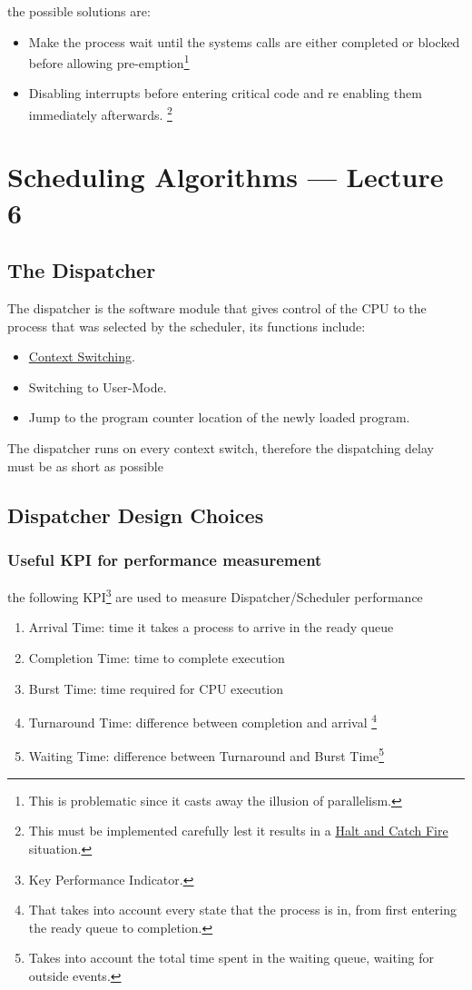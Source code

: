 \documentclass[openright, twoside]{report}
\theoremstyle{definition}
\theoremstyle{example}
\begin{document}
				the possible solutions are:
				\begin{itemize}
					\item Make the process wait until the systems calls are either completed or blocked before  
					allowing pre-emption\footnote{This is problematic since it casts away the illusion of parallelism.}
					\item Disabling interrupts before entering critical code and re enabling 
					them immediately afterwards. \footnote{This must be implemented carefully
					lest it results in a \href{https://en.wikipedia.org/wiki/Halt_and_Catch_Fire_(computing)}{Halt and Catch Fire} situation.}
				\end{itemize}
				
\chapter{Scheduling Algorithms --- Lecture 6}
		\section{The Dispatcher}
			The dispatcher is the software module that gives control of the CPU to the 
			process that was selected by the scheduler, its functions include:
			\begin{itemize}
				\item \hyperref[ssec:context]{Context Switching}. 
				\item Switching to User-Mode.
				\item Jump to the program counter location of the newly loaded program.
			\end{itemize}

		The dispatcher runs on every context switch, therefore the dispatching delay
		must be as short as possible 
		\section{Dispatcher Design Choices}
			\subsection{Useful KPI for performance measurement}
				\label{ssec:KPI}
				the following KPI\footnote{Key Performance Indicator.} are used to measure Dispatcher/Scheduler
				performance
				
				\begin{enumerate}
					\item Arrival Time: time it takes a process to arrive in the ready queue
					\item Completion Time: time to complete execution 
					\item Burst Time: time required for CPU execution  
					\item Turnaround Time: difference between completion and arrival
					\footnote{That takes into account every state that the process
					is in, from first entering the ready queue to completion.}
					\item Waiting Time: difference between Turnaround and Burst Time\footnote{Takes into account
					the total time spent in the waiting queue, waiting for outside events.}
				\end{enumerate}
\end{document}
